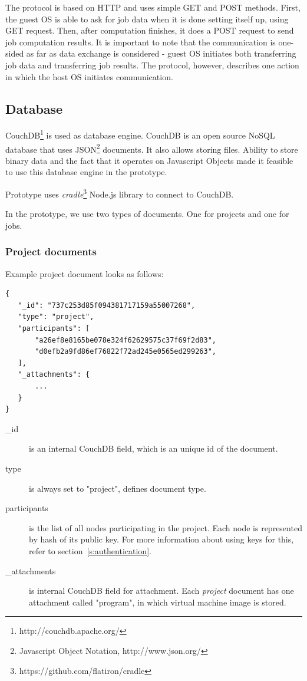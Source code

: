 The protocol is based on HTTP and uses simple GET and POST methods. First, the guest OS is able to ask for job data when it is done setting itself up, using GET request. Then, after computation finishes, it does a POST request to send job computation results. It is important to note that the communication is one-sided as far as data exchange is considered - guest OS initiates both transferring job data and transferring job results. The protocol, however, describes one action in which the host OS initiates communication.

\subsection{Database}

CouchDB\footnote{http://couchdb.apache.org/} is used as database engine. CouchDB is an open source NoSQL database that uses JSON\footnote{Javascript Object Notation, http://www.json.org/} documents. It also allows storing files. Ability to store binary data and the fact that it operates on Javascript Objects made it feasible to use this database engine in the prototype.

Prototype uses \emph{cradle}\footnote{https://github.com/flatiron/cradle} Node.js library to connect to CouchDB.

In the prototype, we use two types of documents. One for projects and one for jobs.

\subsubsection{Project documents}

Example project document looks as follows:

\begin{lstlisting}[caption=Project document in JSON format.]
{
   "_id": "737c253d85f094381717159a55007268",
   "type": "project",
   "participants": [
       "a26ef8e8165be078e324f62629575c37f69f2d83",
       "d0efb2a9fd86ef76822f72ad245e0565ed299263",
   ],
   "_attachments": {
       ...
   }
}
\end{lstlisting}

\begin{description}
\item[\_id] is an internal CouchDB field, which is an unique id of the document.
\item[type] is always set to "project", defines document type.
\item[participants] is the list of all nodes participating in the project. Each node is represented by hash of its public key. For more information about using keys for this, refer to section~\ref{s:authentication}.
\item[\_attachments] is internal CouchDB field for attachment. Each \emph{project} document has one attachment called "program", in which virtual machine image is stored.
\end{description}

